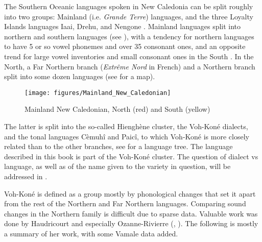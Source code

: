 \begin{sloppypar}
The Southern Oceanic languages spoken in New Caledonia can be split roughly into two groups: Mainland (i.e. \textit{Grande Terre}) languages, and the three Loyalty Islands languages Iaai, Drehu, and Nengone \parencite{ozanne-rivierre_proto-oceanic_1992}. Mainland languages split into northern and southern languages (see ), with a tendency for northern languages to have 5 or so vowel phonemes and over 35 consonant ones, and an opposite trend for large vowel inventories and small consonant ones in the South \parencite[25]{ozanne-rivierre_phonologie_1982}. In the North, a Far Northern branch (\textit{Extrême Nord} in French) and a Northern branch split into some dozen languages (see  for a map). 
\end{sloppypar}\largerpage


\begin{figure}[H]
 		\texttt{[image: figures/Mainland\_New\_Caledonian]}
		\caption{Mainland New Caledonian, North (red) and South (yellow) \parencite{hammarstrom_mainland_2020}}
 		\label{fig:Mainland}
\end{figure}


 The latter is split into the so-called Hienghène cluster, the Voh-Koné dialects, and the tonal languages Cèmuhî and Paicî, to which Voh-Koné is more closely related than to the other branches, \parencite[19]{rivierre_bwatoo_2006} see  for a language tree. The language described in this book is part of the Voh-Koné cluster. The question of dialect vs language, as well as of the name given to the variety in question, will be addressed in .  

Voh-Koné is defined as a group mostly by phonological changes that set it apart from the rest of the Northern and Far Northern languages. Comparing sound changes in the Northern family is difficult due to sparse data. Valuable work was done by Haudricourt \parencite[73--97]{haudricourt_langues_1948} and especially Ozanne-Rivierre (\citeyear{ozanne-rivierre_structural_1995}, \citeyear{ozanne-rivierre_proto-oceanic_1992}). The following is mostly a summary of her work, with some Vamale data added. 

